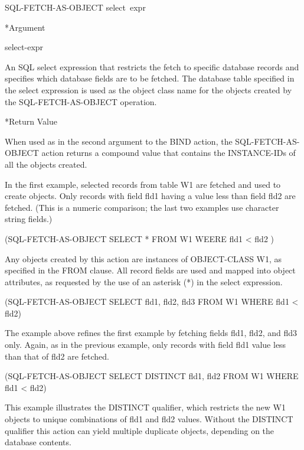 {{\Format

SQL-FETCH-AS-OBJECT select~expr



*Argument

select-expr

An SQL select expression that restricts the fetch to specific
database records and specifies which database fields are to
be fetched. The database table specified in the select
expression is used as the object class name for the objects
created by the SQL-FETCH-AS-OBJECT operation.



*Return Value

When used as in the second argument to the BIND action, the
SQL-FETCH-AS-OBJECT action returns a compound value that
contains the INSTANCE-IDs of all the objects created.



\Example

In the first example, selected records from table W1 are
fetched and used to create objects. Only records with field
fld1 having a value less than field fld2 are fetched. (This
is a numeric comparison; the last two examples use character
string fields.)



(SQL-FETCH-AS-OBJECT SELECT * FROM W1 WEERE fld1 < fld2 )



Any objects created by this action are instances of
OBJECT-CLASS W1, as specified in the FROM clause. All record
fields are used and mapped into object attributes, as
requested by the use of an asterisk (*) in the select
expression.



(SQL-FETCH-AS-OBJECT SELECT fld1, fld2, fld3 FROM W1 WHERE
fld1 < fld2)



The example above refines the first example by fetching
fields fld1, fld2, and fld3 only. Again, as in the previous
example, only records with field fld1 value less than that of
fld2 are fetched.



(SQL-FETCH-AS-OBJECT SELECT DISTINCT fld1, fld2 FROM W1 WHERE
fld1 < fld2)







This example illustrates the DISTINCT qualifier, which
restricts the new W1 objects to unique combinations of fld1
and fld2 values. Without the DISTINCT qualifier this action
can yield multiple duplicate objects, depending on the
database contents.



}}
